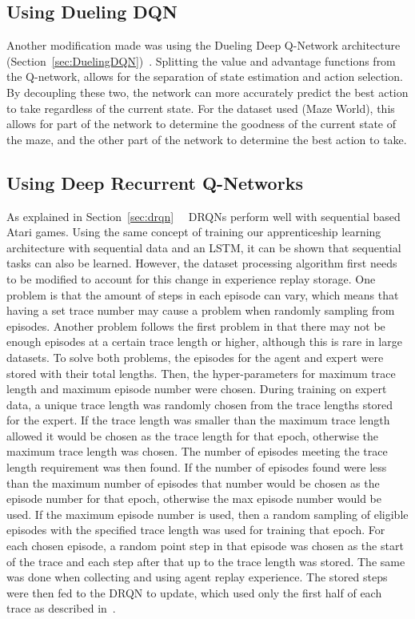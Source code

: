 \documentclass[12pt,american]{report}
\begin{document}
\subsection{Using Dueling DQN}
Another modification made was using the Dueling Deep Q-Network architecture (Section~\ref{sec:DuelingDQN})~\cite{wang2015dueling}.  Splitting the value and advantage functions from the Q-network, allows for the separation of state estimation and action selection.  By decoupling these two, the network can more accurately predict the best action to take regardless of the current state. For the dataset used (Maze World), this allows for part of the network to determine the goodness of the current state of the maze, and the other part of the network to determine the best action to take. 

\subsection{Using Deep Recurrent Q-Networks}
\label{sec:drqn-implementation}
As explained in Section~\ref{sec:drqn}~\cite{HausknechtDRQN}~\cite{DBLP:journals/corr/LampleC16} DRQNs perform well with sequential based Atari games. Using the same concept of training our apprenticeship learning architecture with sequential data and an LSTM, it can be shown that sequential tasks can also be learned.  However, the dataset processing algorithm first needs to be modified to account for this change in experience replay storage.  One problem is that the amount of steps in each episode can vary, which means that having a set trace number may cause a problem when randomly sampling from episodes.  Another problem follows the first problem in that there may not be enough episodes at a certain trace length or higher, although this is rare in large datasets.  To solve both problems, the episodes for the agent and expert were stored with their total lengths.  Then, the hyper-parameters for maximum trace length and maximum episode number were chosen.  During training on expert data, a unique trace length was randomly chosen from the trace lengths stored for the expert.  If the trace length was smaller than the maximum trace length allowed it would be chosen as the trace length for that epoch, otherwise the maximum trace length was chosen.  The number of episodes meeting the trace length requirement was then found.  If the number of episodes found were less than the maximum number of episodes that number would be chosen as the episode number for that epoch, otherwise the max episode number would be used.  If the maximum episode number is used, then a random sampling of eligible episodes with the specified trace length was used for training that epoch.  For each chosen episode, a random point step in that episode was chosen as the start of the trace and each step after that up to the trace length was stored.  The same was done when collecting and using agent replay experience. The stored steps were then fed to the DRQN to update, which used only the first half of each trace as described in~\cite{DBLP:journals/corr/LampleC16}.  
\end{document}
